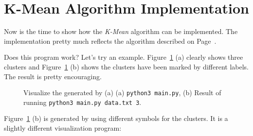 \clearpage

\section{K-Mean Algorithm Implementation}

Now is the time to show how the {\it K-Mean} algorithm can be
implemented. The implementation pretty much reflects the algorithm
described on Page~\pageref{algorithm:kmean}.

\resetlinenumber[1]
\linenumbers
\begin{tt}
  
\end{tt}
\nolinenumbers

\resetlinenumber[1]
\linenumbers
\begin{tt}
  
\end{tt}
\nolinenumbers

\resetlinenumber[1]
\linenumbers
\begin{tt}
  
\end{tt}
\nolinenumbers

\resetlinenumber[1]
\linenumbers
\begin{tt}
  
\end{tt}
\nolinenumbers


Does this program work? Let's try an example.
Figure~\ref{figure:kmean:56} (a) clearly shows three clusters
and Figure~\ref{figure:kmean:56} (b) shows the clusters have been
marked by different labels. The result is pretty encouraging.

\begin{figure}[h] \centering
\caption{Visualize the generated by (a) 
  (a) {\tt python3 main.py}, (b) Result of running {\tt python3 main.py data.txt 3}. }
\label{figure:kmean:56}
\end{figure}




\clearpage
Figure~\ref{figure:kmean:56} (b) is generated by using different
symbols for the clusters. It is a slightly different visualization
program:

\resetlinenumber[1]
\linenumbers
\begin{tt}
  
\end{tt}
\nolinenumbers

